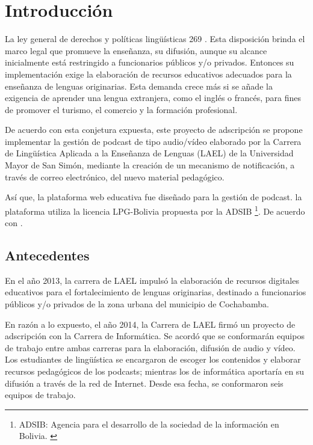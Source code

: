 \chapter{Introducción}

La ley general de derechos y políticas lingüísticas 269 . Esta
disposición brinda el marco legal que promueve la enseñanza, su difusión,
aunque su alcance inicialmente está restringido a funcionarios públicos y/o
privados. Entonces su implementación exige la elaboración de recursos
educativos adecuados para la enseñanza de lenguas originarias. Esta demanda
crece más si se añade la exigencia de aprender una lengua extranjera, como
el inglés o francés, para fines de promover el turismo, el comercio y la
formación profesional.

De acuerdo con esta conjetura expuesta, este proyecto de adscripción se
propone implementar la gestión de podcast de tipo audio/vídeo elaborado por
la Carrera de Lingüística Aplicada a la Enseñanza de Lenguas (LAEL) de la
Universidad Mayor de San Simón, mediante la creación de un mecanismo de
notificación, a través de correo electrónico, del nuevo material pedagógico.

Así que, la plataforma web educativa fue diseñado para la gestión de podcast.
la plataforma utiliza la licencia LPG-Bolivia propuesta por
la ADSIB \footnote{ADSIB: Agencia para el desarrollo de la sociedad de la
información en Bolivia. \cite{LPGBolivia}}. De acuerdo con \cite{LPGBolivia}
.

\section{Antecedentes}

En el año 2013, la carrera de LAEL impulsó la elaboración de recursos digitales
educativos para el fortalecimiento de lenguas originarias, destinado a
funcionarios públicos y/o privados de la zona urbana del municipio de Cochabamba.

En razón a lo expuesto, el año 2014, la Carrera de LAEL firmó un proyecto de
adscripción con la Carrera de Informática. Se acordó que se conformarán equipos
de trabajo entre ambas carreras para la elaboración, difusión de audio y vídeo.
Los estudiantes de lingüística se encargaron de escoger los contenidos y
elaborar recursos pedagógicos de los podcasts; mientras los de informática
aportaría en su difusión a través de la red de Internet. Desde esa fecha, se
conformaron seis equipos de trabajo.


